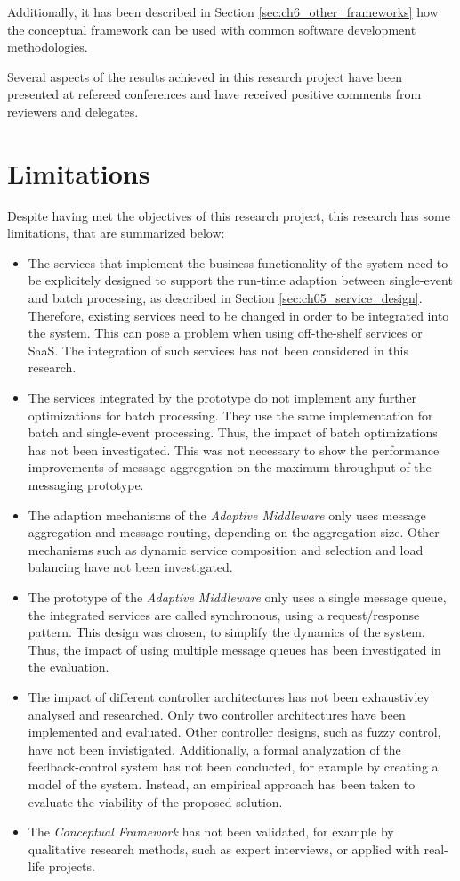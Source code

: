 Additionally, it has been described in Section \ref{sec:ch6_other_frameworks} how the conceptual framework can be used with common software development methodologies.

Several aspects of the results achieved in this research project have been presented
at refereed conferences and have received positive comments from reviewers and delegates.

\section{Limitations}
Despite having met the objectives of this research project, this research has some limitations, that are summarized below: 

\begin{itemize}
	\item The services that implement the business functionality of the system need to be explicitely designed to support the run-time adaption between single-event and batch processing, as described in Section \ref{sec:ch05_service_design}. Therefore, existing services need to be changed in order to be integrated into the system. This can pose a problem when using off-the-shelf services or \ac{SaaS}. The integration of such services has not been considered in this research.
	\item The services integrated by the prototype do not implement any further optimizations for batch processing. They use the same implementation for batch and single-event processing. Thus, the impact of batch optimizations has not been investigated. This was not necessary to show the performance improvements of message aggregation on the maximum throughput of the messaging prototype.
	\item The adaption mechanisms of the \emph{Adaptive Middleware} only uses message aggregation and message routing, depending on the aggregation size. Other mechanisms such as dynamic service composition and selection and load balancing have not been investigated. 
	\item The prototype of the \emph{Adaptive Middleware} only uses a single message queue, the integrated services are called synchronous, using a request/response pattern. This design was chosen, to simplify the dynamics of the system. Thus, the impact of using multiple message queues has been investigated in the evaluation.
	\item The impact of different controller architectures has not been exhaustivley analysed and researched. Only two controller architectures have been implemented and evaluated. Other controller designs, such as fuzzy control, have not been invistigated. Additionally, a formal analyzation of the feedback-control system has not been conducted, for example by creating a model of the system. Instead, an empirical approach has been taken to evaluate the viability of the proposed solution.
	\item The \emph{Conceptual Framework} has not been validated, for example by qualitative research methods, such as expert interviews, or applied with real-life projects.
\end{itemize}

